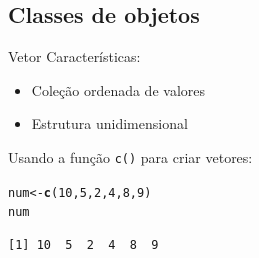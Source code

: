 \documentclass[10pt,handout]{beamer}\usepackage[]{graphicx}\usepackage[]{color}
\makeatletter
\newcommand{\hlnum}[1]{\textcolor[rgb]{0.686,0.059,0.569}{#1}}%
\newcommand{\hlstd}[1]{\textcolor[rgb]{0.345,0.345,0.345}{#1}}%
\newcommand{\hlkwb}[1]{\textcolor[rgb]{0.69,0.353,0.396}{#1}}%
\newcommand{\hlkwd}[1]{\textcolor[rgb]{0.737,0.353,0.396}{\textbf{#1}}}%
\newenvironment{kframe}{%
 \def\at@end@of@kframe{}%
 \ifinner\ifhmode%
  \def\at@end@of@kframe{\end{minipage}}%
  \begin{minipage}{\columnwidth}%
 \fi\fi%
 \def\FrameCommand##1{\hskip\@totalleftmargin \hskip-\fboxsep
 \colorbox{shadecolor}{##1}\hskip-\fboxsep
     \hskip-\linewidth \hskip-\@totalleftmargin \hskip\columnwidth}%
 \MakeFramed {\advance\hsize-\width
   \@totalleftmargin\z@ \linewidth\hsize
   \@setminipage}}%
 {\par\unskip\endMakeFramed%
 \at@end@of@kframe}
\newenvironment{knitrout}{}{} %
\makeatother
\begin{document}
\subsection[Classes]{Classes de objetos}

\begin{frame}[fragile]{Vetor}
Características:
\begin{itemize}
\item Coleção ordenada de valores
\item Estrutura unidimensional
\end{itemize}
Usando a função \texttt{c()} para criar vetores:
\begin{knitrout}\small
{}\color{fgcolor}\begin{kframe}
\begin{alltt}
\hlstd{num} \hlkwb{<-} \hlkwd{c}\hlstd{(}\hlnum{10}\hlstd{,} \hlnum{5}\hlstd{,} \hlnum{2}\hlstd{,} \hlnum{4}\hlstd{,} \hlnum{8}\hlstd{,} \hlnum{9}\hlstd{)}
\hlstd{num}
\end{alltt}
\begin{verbatim}
[1] 10  5  2  4  8  9
\end{verbatim}
\end{kframe}
\end{knitrout}
\end{frame}
\end{document}
